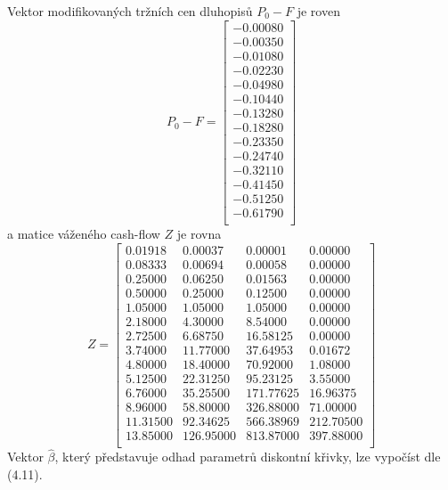 \documentclass[a4paper]{book}
\begin{document}
Vektor modifikovaných tržních cen dluhopisů $P_0 - F$ je roven
\begin{equation*}
P_0 - F =
\begin{bmatrix}
-0.00080 \\
-0.00350 \\
-0.01080 \\
-0.02230 \\
-0.04980 \\
-0.10440 \\
-0.13280 \\
-0.18280 \\
-0.23350 \\
-0.24740 \\
-0.32110 \\
-0.41450 \\
-0.51250 \\
-0.61790 \\
\end{bmatrix}
\end{equation*}
a matice váženého cash-flow $Z$ je rovna
\begin{equation*}
Z =
\begin{bmatrix}
 0.01918 &   0.00037 &   0.00001 &   0.00000 \\
 0.08333 &   0.00694 &   0.00058 &   0.00000 \\
 0.25000 &   0.06250 &   0.01563 &   0.00000 \\ 
 0.50000 &   0.25000 &   0.12500 &   0.00000 \\
 1.05000 &   1.05000 &   1.05000 &   0.00000 \\
 2.18000 &   4.30000 &   8.54000 &   0.00000 \\
 2.72500 &   6.68750 &  16.58125 &   0.00000 \\
 3.74000 &  11.77000 &  37.64953 &   0.01672 \\
 4.80000 &  18.40000 &  70.92000 &   1.08000 \\
 5.12500 &  22.31250 &  95.23125 &   3.55000 \\
 6.76000 &  35.25500 & 171.77625 &  16.96375 \\
 8.96000 &  58.80000 & 326.88000 &  71.00000 \\
11.31500 &  92.34625 & 566.38969 & 212.70500 \\
13.85000 & 126.95000 & 813.87000 & 397.88000 \\
\end{bmatrix}
\end{equation*}
Vektor $\hat{\beta}$, který představuje odhad parametrů diskontní křivky, lze vypočíst dle (4.11).
\end{document}
